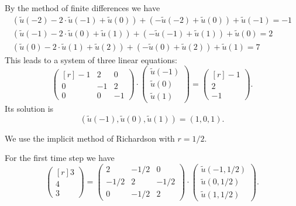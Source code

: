 \begin{loesung}
\begin{teilaufgaben}
\item
By the method of finite differences we have
\begin{gather*}
(\tilde u(-2) - 2 \cdot \tilde u(-1) + \tilde u(0))
+ (- \tilde u(-2) + \tilde u(0)) + \tilde u(-1)
= -1
\\
(\tilde u(-1) - 2 \cdot \tilde u(0) + \tilde u(1))
+ (- \tilde u(-1) + \tilde u(1)) + \tilde u(0)
= 2
\\
(\tilde u(0) - 2 \cdot \tilde u(1) + \tilde u(2))
+ (- \tilde u(0) + \tilde u(2)) + \tilde u(1)
= 7
\end{gather*}
This leads to a system of three linear equations:
\begin{equation}
\begin{pmatrix*}[r]
-1 &  2 & 0 \\
 0 & -1 & 2 \\
 0 & 0 & -1
\end{pmatrix*}
\cdot
\begin{pmatrix}
\tilde u(-1) \\
\tilde u(0)  \\
\tilde u(1)
\end{pmatrix}
=
\begin{pmatrix*}[r]
-1 \\
 2 \\
-1
\end{pmatrix*}.
\tag{\bf 2P}
\end{equation}
Its solution is
\begin{equation}
(\tilde u(-1),  \tilde u(0), \tilde u(1))
=
(1, 0 , 1).
\tag{\bf 1P}
\end{equation}

\item
We use the implicit method of Richardson with $r = 1/2$. 

For the first time step we have  
\begin{equation}
\begin{pmatrix*}[r]
 3 \\
 4 \\
 3
\end{pmatrix*}
=
\begin{pmatrix}
 2   & -1/2 & 0 \\
-1/2 & 2 & -1/2 \\
 0   & -1/2 & 2
\end{pmatrix}
\cdot
\begin{pmatrix}
\tilde u(-1,1/2) \\
\tilde u(0,1/2)  \\
\tilde u(1,1/2)
\end{pmatrix}.
\tag{\bf 1P}
\end{equation}


\end{teilaufgaben}
\end{loesung}

